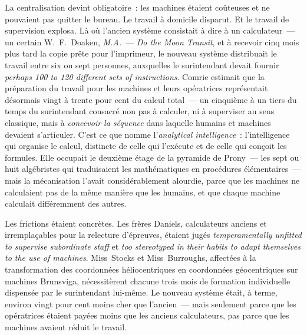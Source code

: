 La centralisation devint obligatoire~: les machines étaient coûteuses et ne pouvaient pas quitter le bureau. Le travail à domicile disparut. Et le travail de supervision explosa. Là où l'ancien système consistait à dire à un calculateur~--- un certain W.~F.~Doaken, \emph{M.A.}~--- \og \emph{Do the Moon Transit}\fg{}, et à recevoir cinq mois plus tard la copie prête pour l'imprimeur, le nouveau système distribuait le travail entre six ou sept personnes, auxquelles le surintendant devait fournir \og \emph{perhaps 100 to 120 different sets of instructions}\fg{}. %
Comrie estimait que la préparation du travail pour les machines et leurs opératrices représentait désormais vingt à trente pour cent du calcul total~--- un cinquième à un tiers du temps du surintendant consacré non pas à calculer, ni à superviser au sens classique, mais à \emph{concevoir la séquence} dans laquelle humains et machines devaient s'articuler. C'est ce que \textcite{daston_calculation_2018} nomme l'\emph{analytical intelligence}~: l'intelligence qui organise le calcul, distincte de celle qui l'exécute et de celle qui conçoit les formules. Elle occupait le deuxième étage de la pyramide de Prony~--- les sept ou huit algébristes qui traduisaient les mathématiques en procédures élémentaires~--- mais la mécanisation l'avait considérablement alourdie, parce que les machines ne calculaient pas de la même manière que les humains, et que chaque machine calculait différemment des autres.

Les frictions étaient concrètes. Les frères Daniels, calculateurs anciens et irremplaçables pour la relecture d'épreuves, étaient jugés \og \emph{temperamentally unfitted to supervise subordinate staff}\fg{} et \og \emph{too stereotyped in their habits to adapt themselves to the use of machines}\fg{}. Miss~Stocks et Miss~Burroughs, affectées à la transformation des coordonnées héliocentriques en coordonnées géocentriques sur machines Brunsviga, nécessitèrent chacune trois mois de formation individuelle dispensée par le surintendant lui-même. Le nouveau système était, à terme, environ vingt pour cent moins cher que l'ancien~--- mais seulement parce que les opératrices étaient payées moins que les anciens calculateurs, pas parce que les machines avaient réduit le travail.

